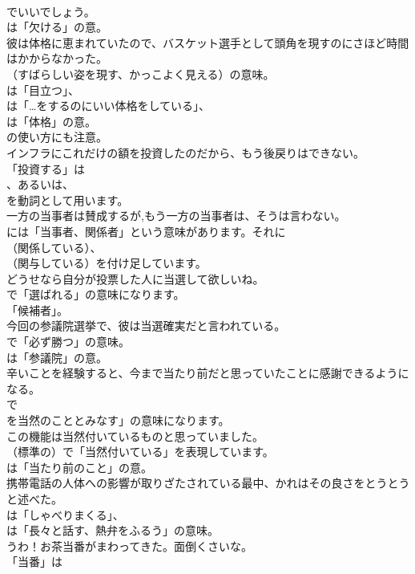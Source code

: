 \documentclass[8pt]{extreport}
\begin{document}
\begin{CJK}{UTF8}{min}
\\	でいいでしょう。
\\	は「欠ける」の意。	
\\	彼は体格に恵まれていたので、バスケット選手として頭角を現すのにさほど時間はかからなかった。 
\\	（すばらしい姿を現す、かっこよく見える）の意味。
\\	は「目立つ」、
\\	は「…をするのにいい体格をしている」、
\\	は「体格」の意。
\\	の使い方にも注意。	
\\	インフラにこれだけの額を投資したのだから、もう後戻りはできない。 
\\	「投資する」は 
\\	、あるいは、
\\	を動詞として用います。	
\\	一方の当事者は賛成するが,もう一方の当事者は、そうは言わない。 
\\	には「当事者、関係者」という意味があります。それに
\\	（関係している）、
\\	（関与している）を付け足しています。	
\\	どうせなら自分が投票した人に当選して欲しいね。 
\\	で「選ばれる」の意味になります。
\\	「候補者」。	
\\	今回の参議院選挙で、彼は当選確実だと言われている。 
\\	で「必ず勝つ」の意味。
\\	は「参議院」の意。	
\\	辛いことを経験すると、今まで当たり前だと思っていたことに感謝できるようになる。 
\\	で
\\	を当然のこととみなす」の意味になります。	
\\	この機能は当然付いているものと思っていました。 
\\	（標準の）で「当然付いている」を表現しています。
\\	は「当たり前のこと」の意。	
\\	携帯電話の人体への影響が取りざたされている最中、かれはその良さをとうとうと述べた。 
\\	は「しゃべりまくる」、
\\	は「長々と話す、熱弁をふるう」の意味。	
\\	うわ！お茶当番がまわってきた。面倒くさいな。 
\\	「当番」は

\end{CJK}
\end{document}
